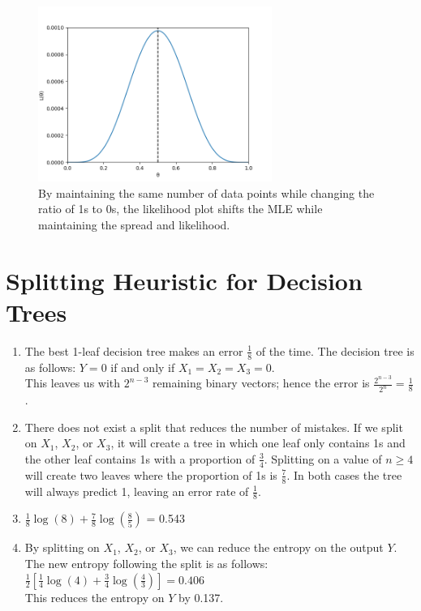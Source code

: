 \documentclass[11pt]{article}
\newcommand{\solution}[1]{{{\color{blue}{\bf Solution:} {#1}}}}
\begin{document}
\begin{enumerate}
{\begin{figure}[!htbp]
    \centering
    \includegraphics[width=3in]{1diii.png}
    \caption{By maintaining the same number of data points while changing the ratio of 1s to 0s, the likelihood plot shifts the MLE while maintaining the spread and likelihood.}
\end{figure}
}
\end{enumerate}
\newpage

\section{Splitting Heuristic for Decision Trees}
\begin{enumerate}
\item
\solution{The best 1-leaf decision tree makes an error $\frac{1}{8}$ of the time.  The decision tree is as follows: $Y = 0$ if and only if $X_1 = X_2 = X_3 = 0$. \\
This leaves us with $2^{n-3}$ remaining binary vectors; hence the error is $\frac{2^{n-3}}{2^n} = \frac{1}{8}$.
}
\vspace{1cm}

\item
\solution{There does not exist a split that reduces the number of mistakes. If we split on $X_1$, $X_2$, or $X_3$, it will create a tree in which one leaf only contains 1s and the other leaf contains 1s with a proportion of $\frac{3}{4}$. Splitting on a value of $n \geq 4$ will create two leaves where the proportion of 1s is $\frac{7}{8}$. In both cases the tree will always predict 1, leaving an error rate of $\frac{1}{8}$.
}
\vspace{1cm}

\item
\solution{$\frac{1}{8}\log(8) + \frac{7}{8}\log(\frac{8}{5})$ = 0.543
}
\vspace{1cm}

\item
\solution{By splitting on $X_1$, $X_2$, or $X_3$, we can reduce the entropy on the output $Y$. The new entropy following the split is as follows: \\
$\frac{1}{2}[\frac{1}{4}\log(4)+\frac{3}{4}\log(\frac{4}{3})]= 0.406$ \\
This reduces the entropy on $Y$ by 0.137.
}
\newpage
\end{enumerate}
\end{document}

